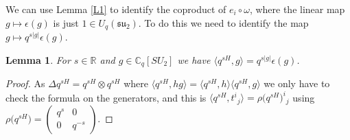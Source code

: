 \documentclass[pdftex]{sigma}
\numberwithin{equation}{section}
\newtheorem{Lemma}[Theorem]{Lemma}
\newcommand{\tens}{\mathop{\otimes}}
\newcommand{\R}{\mathbb{R}}
\newcommand{\C}{\mathbb{C}}
\newcommand{\<}{\langle}
\renewcommand{\>}{\rangle}
\begin{document}
We can use Lemma \ref{L1} to identify the coproduct of $ e_{i} \circ \omega $, where the linear map $ g\mapsto \epsilon(g) $ is just $ 1\in U_{q}({\mathfrak{su}}_{2}) $. To do this we need to identify the map $ g\mapsto q^{s|g|}\epsilon(g) $.
\begin{Lemma}\label{L2}
	For $ s \in \R$ and $ g\in \C_{q}[SU_{2}] $ we have $\langle q^{sH}, g\rangle= q^{s|g|} \epsilon (g) $.
\end{Lemma}
\begin{proof}As $ \Delta q^{s H}=q^{s H} \tens q^{sH} $ where $ \big\langle q^{sH},hg\big\rangle= \big\langle q^{s H},h\big\rangle \big\langle q^{s H}, g \big\rangle $
we only have to check the formula on the generators, and this is $ \big\langle q^{s H}, t^{i} {}_{j}\big\rangle= \rho \big(q^{s H} \big)^{i} {}_{j} $ using $ \rho\big(q^{s H}\big) = \left( \begin{smallmatrix}
	q^{s} & 0\\
	0& q^{-s}
\end{smallmatrix}
\right)$.
\end{proof}
\end{document}
